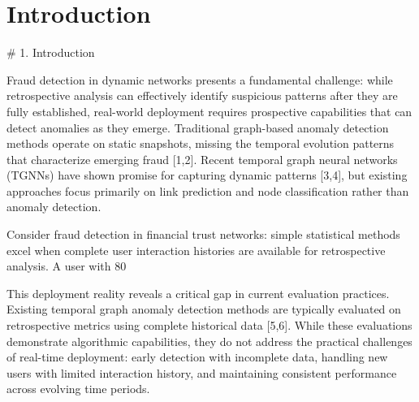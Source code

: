 \section{Introduction}
\label{sec:introduction}


# 1. Introduction

Fraud detection in dynamic networks presents a fundamental challenge: while retrospective analysis can effectively identify suspicious patterns after they are fully established, real-world deployment requires prospective capabilities that can detect anomalies as they emerge. Traditional graph-based anomaly detection methods operate on static snapshots, missing the temporal evolution patterns that characterize emerging fraud [1,2]. Recent temporal graph neural networks (TGNNs) have shown promise for capturing dynamic patterns [3,4], but existing approaches focus primarily on link prediction and node classification rather than anomaly detection.

Consider fraud detection in financial trust networks: simple statistical methods excel when complete user interaction histories are available for retrospective analysis. A user with 80%

This deployment reality reveals a critical gap in current evaluation practices. Existing temporal graph anomaly detection methods are typically evaluated on retrospective metrics using complete historical data [5,6]. While these evaluations demonstrate algorithmic capabilities, they do not address the practical challenges of real-time deployment: early detection with incomplete data, handling new users with limited interaction history, and maintaining consistent performance across evolving time periods.


